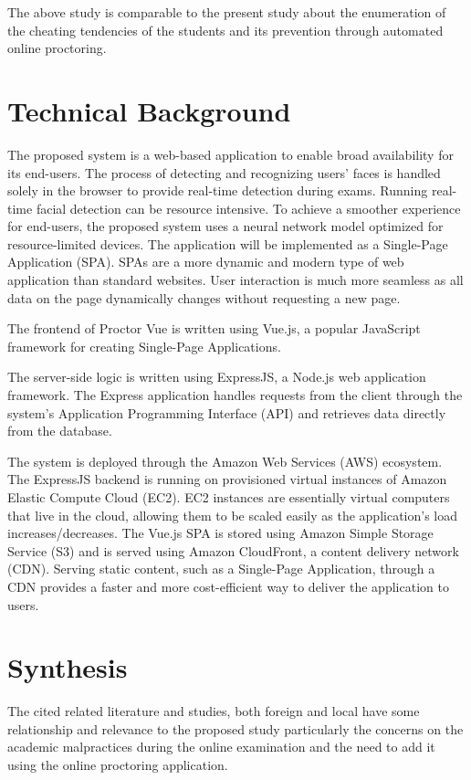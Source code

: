 The above study is comparable to the present study about the enumeration of the cheating tendencies of the students and its prevention through automated online proctoring.

\section{Technical Background}

The proposed system is a web-based application to enable broad availability for its end-users.
The process of detecting and recognizing users' faces is handled solely in the browser to provide real-time detection during exams.
Running real-time facial detection can be resource intensive.
To achieve a smoother experience for end-users, the proposed system uses a neural network model optimized for resource-limited devices.
The application will be implemented as a Single-Page Application (SPA).
SPAs are a more dynamic and modern type of web application than standard websites.
User interaction is much more seamless as all data on the page dynamically changes without requesting a new page.

The frontend of Proctor Vue is written using Vue.js, a popular JavaScript framework for creating Single-Page Applications.

The server-side logic is written using ExpressJS, a Node.js web application framework.
The Express application handles requests from the client through the system's Application Programming Interface (API) and retrieves data directly from the database.

The system is deployed through the Amazon Web Services (AWS) ecosystem.
The ExpressJS backend is running on provisioned virtual instances of Amazon Elastic Compute Cloud (EC2).
EC2 instances are essentially virtual computers that live in the cloud, allowing them to be scaled easily as the application's load increases/decreases.
The Vue.js SPA is stored using Amazon Simple Storage Service (S3) and is served using Amazon CloudFront, a content delivery network (CDN).
Serving static content, such as a Single-Page Application, through a CDN provides a faster and more cost-efficient way to deliver the application to users.


\section{Synthesis}

The cited related literature and studies, both foreign and local have some relationship and relevance to the proposed study particularly the concerns on the academic malpractices during the online examination and the need to add it using the online proctoring application.

